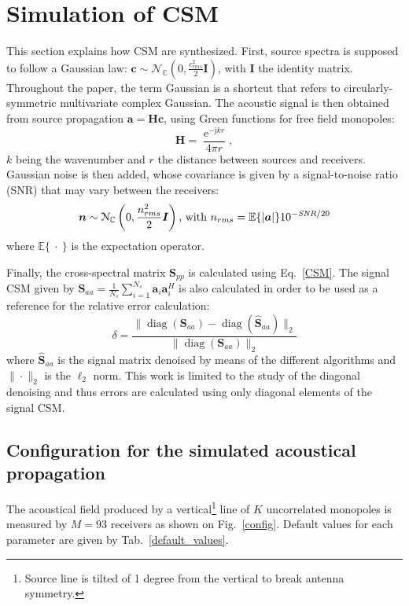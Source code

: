 \documentclass[fontsize=12pt,DIV13,paper=a4,abstract=true,titlepage=false]{scrartcl}
\newcommand{\diag}[1]{\operatorname{diag}\left(#1\right)}
\newcommand{\ci}{\text{j}} %
\begin{document}
\section{Simulation of CSM}
This section explains how CSM are synthesized. 
First, source spectra is supposed to follow a Gaussian law: $\bm{c}\sim \mathcal{N}_{\mathbb{C}} \left(0,\frac{c_{rms}^2}{2}\bm{I} \right)$, with $\bm{I}$ the identity matrix. Throughout the paper, the term Gaussian is a shortcut that refers to circularly-symmetric multivariate complex Gaussian. The acoustic signal is then obtained from source propagation $\bm{a} = \bm{Hc}$, using Green functions for free field monopoles: 
\begin{equation}
	\bm{H}=\frac{\operatorname{e}^{-\ci k r}}{4 \pi r},
\end{equation}
$k$ being the wavenumber and $r$ the distance between sources and receivers. 
Gaussian noise is then added, whose covariance is given by a signal-to-noise ratio (SNR) that may vary between the receivers:
\begin{equation}
  \bm{n}\sim \mathcal{N}_{\mathbb{C}} \left(0,\frac{n_{rms}^2}{2}\bm{I}\right)   \text{,~with } n_{rms}=\mathbb{E}\{|\bm{a}|\}10^{-\text{\itshape SNR}/20}
  \label{noise}
\end{equation}
where $\mathbb{E}\{ ~\cdot~\}$ is the expectation operator. 

Finally, the cross-spectral matrix $\bm{S}_{pp}$ is calculated using Eq.~\eqref{CSM}.  The signal CSM given by \hbox{$\bm{S}_{aa}=\frac{1}{N_s}\sum_{i=1}^{N_s}\bm{a}_i\bm{a}_i^H$} is also calculated in order to be used as a reference for the relative error calculation:
\begin{equation}
    \delta = \frac{\|\diag{\bm{S}_{aa}}  - \diag{\bm{\hat{S}}_{aa}}\|_2}{\|\diag{\bm{S}_{aa} } \|_2}
    \label{err}
\end{equation}
where $\bm{\hat{S}}_{aa}$ is the signal matrix denoised  by means of the different algorithms and $\| \cdot \|_2$ is the $\ell_2$ norm. This work is limited to the study of the diagonal denoising and thus errors are calculated using only diagonal elements of the signal CSM.

\subsection*{Configuration for the simulated acoustical propagation\label{config_section}}

The acoustical field produced by a vertical\footnote{Source line is tilted of 1 degree from the vertical to break antenna symmetry.} line of $K$ uncorrelated monopoles is measured by $M=93$ receivers as shown on Fig.~\ref{config}.
Default values for each parameter are given by Tab.~\ref{default_values}.
\end{document}
